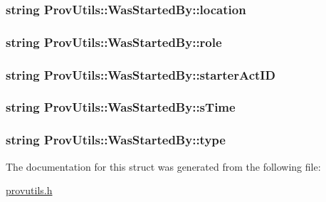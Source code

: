 \hypertarget{struct_prov_utils_1_1_was_started_by_abeab143270034629e44f777701dc6792}{
\subsubsection[{location}]{\setlength{\rightskip}{0pt plus 5cm}string Prov\-Utils\-::\-Was\-Started\-By\-::location}}\label{struct_prov_utils_1_1_was_started_by_abeab143270034629e44f777701dc6792}
\hypertarget{struct_prov_utils_1_1_was_started_by_a6d17405f0c853dec1d882b9fe93033b5}{
\subsubsection[{role}]{\setlength{\rightskip}{0pt plus 5cm}string Prov\-Utils\-::\-Was\-Started\-By\-::role}}\label{struct_prov_utils_1_1_was_started_by_a6d17405f0c853dec1d882b9fe93033b5}
\hypertarget{struct_prov_utils_1_1_was_started_by_ae187cefa27b4729ca4f8c924788ff43c}{
\subsubsection[{starter\-Act\-I\-D}]{\setlength{\rightskip}{0pt plus 5cm}string Prov\-Utils\-::\-Was\-Started\-By\-::starter\-Act\-I\-D}}\label{struct_prov_utils_1_1_was_started_by_ae187cefa27b4729ca4f8c924788ff43c}
\hypertarget{struct_prov_utils_1_1_was_started_by_a473cff86ed691f29812971c94f657a87}{
\subsubsection[{s\-Time}]{\setlength{\rightskip}{0pt plus 5cm}string Prov\-Utils\-::\-Was\-Started\-By\-::s\-Time}}\label{struct_prov_utils_1_1_was_started_by_a473cff86ed691f29812971c94f657a87}
\hypertarget{struct_prov_utils_1_1_was_started_by_a03dcf675037a3f98c400f5426eeb7de6}{
\subsubsection[{type}]{\setlength{\rightskip}{0pt plus 5cm}string Prov\-Utils\-::\-Was\-Started\-By\-::type}}\label{struct_prov_utils_1_1_was_started_by_a03dcf675037a3f98c400f5426eeb7de6}


The documentation for this struct was generated from the following file\-:\begin{DoxyCompactItemize}
\item 
\hyperlink{provutils_8h}{provutils.\-h}\end{DoxyCompactItemize}
